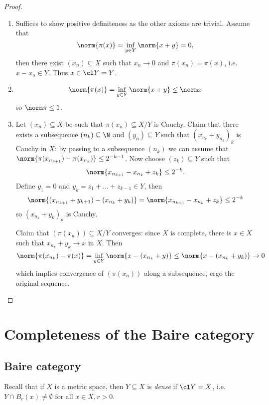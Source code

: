 \documentclass[a4paper]{article}
\begin{document}
\begin{proof}\leavevmode
  \begin{enumerate}
  \item Suffices to show positive definiteness as the other axioms are trivial. Assume that
    \[
      \norm{\pi(x)} = \inf_{y \in Y} \norm{x + y} = 0,
    \]
    then there exist \((x_n) \subseteq X\) such that \(x_n \to 0\) and \(\pi(x_n) = \pi(x)\), i.e.\ \(x - x_n \in Y\). Thus \(x \in \cl Y = Y\).
  \item
    \[
      \norm{\pi(x)} = \inf_{y \in Y} \norm{x + y} \leq \norm x
    \]
    so \(\norm \pi \leq 1\).
  \item Let \((x_n) \subseteq X\) be such that \(\pi(x_n) \subseteq X / Y\) is Cauchy. Claim that there exists a subsequence \((n_k) \subseteq \N\) and \((y_n) \subseteq Y\) such that \((x_{n_k} + y_{n_k})_k\) is Cauchy in \(X\): by passing to a subsequence \((n_k)\) we can assume that \(\norm{\pi(x_{n_{k + 1}}) - \pi(x_{n_k})} \leq 2^{-k - 1}\). Now choose \((z_k) \subseteq Y\) such that
    \[
      \norm{x_{n_{k + 1}} - x_{n_k} + z_k} \leq 2^{-k}.
    \]
    Define \(y_1 = 0\) and \(y_k = z_1 + \dots + z_{k - 1} \in Y\), then
    \[
      \norm{(x_{n_{k + 1}} + y_{k + 1}) - (x_{n_k} + y_k)}
      = \norm{x_{n_{k + 1}} - x_{n_k} + z_k}
        \leq 2^{-k}
    \]
    so \((x_{n_k} + y_k)_k\) is Cauchy.

    Claim that \((\pi(x_n)) \subseteq X / Y\) converges: since \(X\) is complete, there is \(x \in X\) such that \(x_{n_k} + y_k \to x\) in \(X\). Then
    \[
      \norm{\pi(x_{n_k}) - \pi(x)}
      = \inf_{y \in Y} \norm{x - (x_{n_k} + y)}
      \leq \norm{x - (x_{n_k} + y_k)}
      \to 0
    \]
    which implies convergence of \((\pi(x_n))\) along a subsequence, ergo the original sequence.
  \end{enumerate}
\end{proof}

\section{Completeness of the Baire category}

\subsection{Baire category}

Recall that if \(X\) is a metric space, then \(Y \subseteq X\) is \emph{dense} if \(\cl Y = X\), i.e.\ \(Y \cap B_r(x) \neq \emptyset\) for all \(x \in X, r > 0\).
\end{document}
